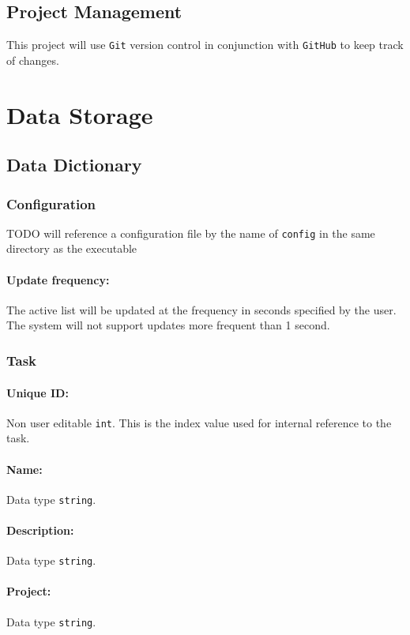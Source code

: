 \documentclass[12pt]{article}
\newcommand{\e}[1] {{\tt #1}}
\begin{document}
\subsection{Project Management}
This project will use {\tt Git} version control in conjunction with {\tt GitHub} to keep track of changes.

\section{Data Storage}\label{sec:Data Storage}
\subsection{Data Dictionary}\label{sec:Data Dictionary}
\subsubsection{Configuration} \label{sec:Configuration}
 TODO will reference a configuration file by the name of \e{config} in the same directory as the executable 
\paragraph{Update frequency:} \label{sec:Update timing} The active list will be updated at the frequency in seconds specified by the user. The system will not support updates more frequent than 1 second.

\subsubsection{Task} \label{sec:Task}
\paragraph{Unique ID:} Non user editable \e{int}. This is the index value used for internal reference to the task. 
\paragraph{Name:} Data type \e{string}.
\paragraph{Description:} Data type \e{string}.
\paragraph{Project:} Data type \e{string}.
\end{document}
